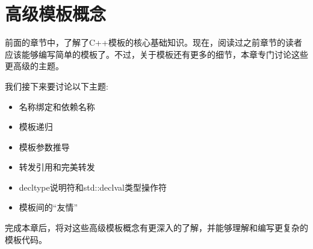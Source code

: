 \chapter{高级模板概念}
前面的章节中，了解了C++模板的核心基础知识。现在，阅读过之前章节的读者应该能够编写简单的模板了。不过，关于模板还有更多的细节，本章专门讨论这些更高级的主题。

我们接下来要讨论以下主题:

\begin{itemize}
  \item 名称绑定和依赖名称
  \item 模板递归
  \item 模板参数推导
  \item 转发引用和完美转发
  \item decltype说明符和std::declval类型操作符
  \item 模板间的“友情”
\end{itemize}

完成本章后，将对这些高级模板概念有更深入的了解，并能够理解和编写更复杂的模板代码。











